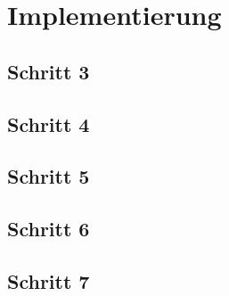 
\section{Implementierung} 





\clearpage
\subsection{Schritt 3}



\clearpage
\subsection{Schritt 4}


\clearpage
\subsection{Schritt 5}


\clearpage
\subsection{Schritt 6}


\clearpage
\subsection{Schritt 7}
